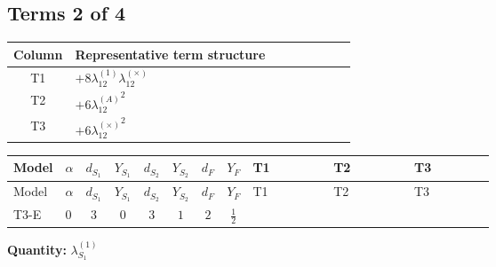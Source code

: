 \documentclass[8pt]{article}
\begin{document}
\begin{landscape}
\subsection*{Terms 2 of 4}
\begin{center}
\begin{tabular}{@{}c >{\raggedright\arraybackslash}p{0.82\linewidth}@{}}
\toprule
Column & Representative term structure \\
\midrule
T1 & \(\displaystyle +8 {\lambda_{12}^{(1)}} {\lambda_{12}^{(\times)}}\) \\
\midrule
T2 & \(\displaystyle +6 {\lambda_{12}^{(A)}}^2\) \\
\midrule
T3 & \(\displaystyle +6 {\lambda_{12}^{(\times)}}^2\) \\
\midrule
\bottomrule
\end{tabular}
\end{center}
\smallskip
\tiny
\begin{longtable}{@{}llcccccc >{\raggedright\arraybackslash}p{0.21\linewidth} >{\raggedright\arraybackslash}p{0.21\linewidth} >{\raggedright\arraybackslash}p{0.21\linewidth}@{}}
\toprule
Model & $\alpha$ & $d_{S_1}$ & $Y_{S_1}$ & $d_{S_2}$ & $Y_{S_2}$ & $d_F$ & $Y_F$ & T1 & T2 & T3 \\
\midrule
\endfirsthead
\toprule
Model & $\alpha$ & $d_{S_1}$ & $Y_{S_1}$ & $d_{S_2}$ & $Y_{S_2}$ & $d_F$ & $Y_F$ & T1 & T2 & T3 \\
\midrule
\endhead
T3-E & $0$ & $3$ & $0$ & $3$ & $1$ & $2$ & $\frac{1}{2}$ & \scriptsize\adjustbox{max width=\linewidth}{$\begin{gathered} +8 {\lambda_{12}^{(1)}} {\lambda_{12}^{(\times)}}\end{gathered}$} & \scriptsize\adjustbox{max width=\linewidth}{$\begin{gathered} +6 {\lambda_{12}^{(A)}}^2\end{gathered}$} & \scriptsize\adjustbox{max width=\linewidth}{$\begin{gathered} +6 {\lambda_{12}^{(\times)}}^2\end{gathered}$} \\
\midrule
\bottomrule
\end{longtable}
\clearpage
\noindent\textbf{Quantity: }$\lambda_{S_1}^{(1)}$\par\smallskip

\end{landscape}
\end{document}
